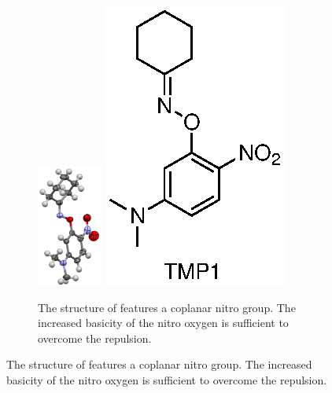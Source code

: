 \begin{refsection}
\begin{figure}
    \centering
    \begin{subfigure}{\linewidth}
        \centering
        \includegraphics[height=4cm]{Figures/cyclohexanone-oxime-2n-5nme2p.pdf}
        \includegraphics[scale=0.74]{Figures/cyclohexanone-oxime-2n-5nme2p.eps}
        \caption[Structure of .]{The structure of  features a coplanar nitro group. The increased basicity of the nitro oxygen is sufficient to overcome the repulsion.}\label{fig:cyclohexanone-oxime-2n-5nme2p}
    \end{subfigure}


\end{figure}
\end{refsection}
